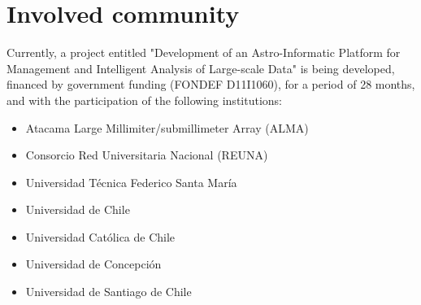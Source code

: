 %
%
%
%
%
%
%
%
%
%
%
%

\section{Involved community}

Currently, a project entitled "Development of an Astro-Informatic Platform
for Management and Intelligent Analysis of Large-scale Data" is being developed,
financed by government funding (FONDEF D11I1060), for a period of 28 months,
and with the participation of the following institutions:

\begin{itemize}
	\item Atacama Large Millimiter/submillimeter Array (ALMA)
	\item Consorcio Red Universitaria Nacional (REUNA)
	\item Universidad Técnica Federico Santa María
	\item Universidad de Chile
	\item Universidad Católica de Chile
	\item Universidad de Concepción
	\item Universidad de Santiago de Chile
\end{itemize}

